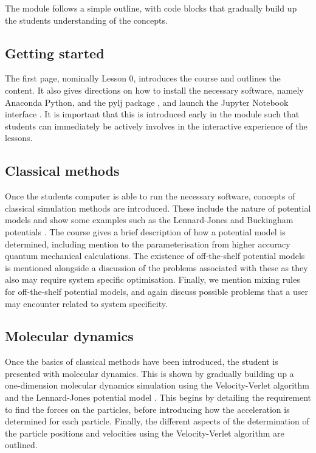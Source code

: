 \documentclass[pdf]{iucr}              %
\begin{document}
The module follows a simple outline, with code blocks that gradually build up the students understanding of the concepts.

\subsection{Getting started}

The first page, nominally Lesson 0, introduces the course and outlines the content.
It also gives directions on how to install the necessary software, namely Anaconda Python, and the pylj package \cite{McCluskey2018}, and launch the Jupyter Notebook interface \cite{Kluyver2016}.
It is important that this is introduced early in the module such that students can immediately be actively involves in the interactive experience of the lessons.

\subsection{Classical methods}

Once the students computer is able to run the necessary software, concepts of classical simulation methods are introduced.
These include the nature of potential models and show some examples such as the Lennard-Jones and Buckingham potentials \cite{LennardJones1924,Buckingham1938}.
The course gives a brief description of how a potential model is determined, including mention to the parameterisation from higher accuracy quantum mechanical calculations.
The existence of off-the-shelf potential models is mentioned alongside a discussion of the problems associated with these as they also may require system specific optimisation.
Finally, we mention mixing rules for off-the-shelf potential models, and again discuss possible problems that a user may encounter related to system specificity.

\subsection{Molecular dynamics}

Once the basics of classical methods have been introduced, the student is presented with molecular dynamics.
This is shown by gradually building up a one-dimension molecular dynamics simulation using the Velocity-Verlet algorithm \cite{Swope1982} and the Lennard-Jones potential model \cite{LennardJones1924}.
This begins by detailing the requirement to find the forces on the particles, before introducing how the acceleration is determined for each particle.
Finally, the different aspects of the determination of the particle positions and velocities using the Velocity-Verlet algorithm are outlined.
\end{document}
